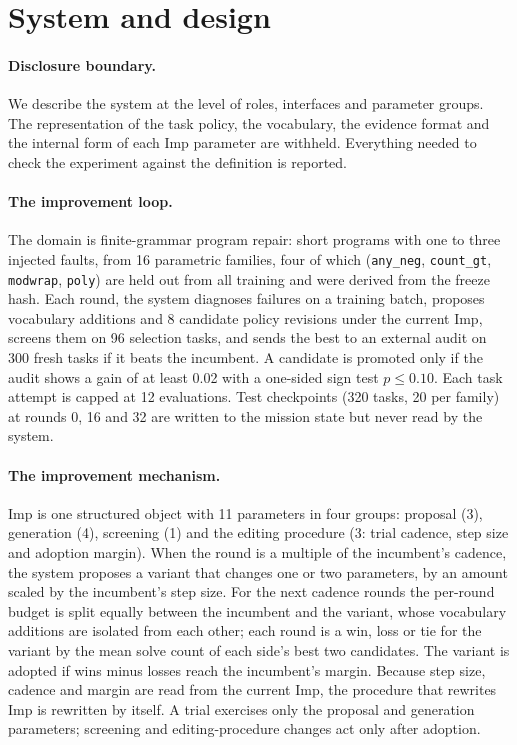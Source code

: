 \documentclass[11pt]{article}
\begin{document}
\section{System and design}\label{sec:design}

\paragraph{Disclosure boundary.} We describe the system at the level of roles, interfaces and parameter groups. The representation of the task policy, the vocabulary, the evidence format and the internal form of each Imp parameter are withheld. Everything needed to check the experiment against the definition is reported.

\paragraph{The improvement loop.} The domain is finite-grammar program repair: short programs with one to three injected faults, from 16 parametric families, four of which (\texttt{any\_neg}, \texttt{count\_gt}, \texttt{modwrap}, \texttt{poly}) are held out from all training and were derived from the freeze hash. Each round, the system diagnoses failures on a training batch, proposes vocabulary additions and 8 candidate policy revisions under the current Imp, screens them on 96 selection tasks, and sends the best to an external audit on 300 fresh tasks if it beats the incumbent. A candidate is promoted only if the audit shows a gain of at least 0.02 with a one-sided sign test $p \le 0.10$. Each task attempt is capped at 12 evaluations. Test checkpoints (320 tasks, 20 per family) at rounds 0, 16 and 32 are written to the mission state but never read by the system.

\paragraph{The improvement mechanism.} Imp is one structured object with 11 parameters in four groups: proposal (3), generation (4), screening (1) and the editing procedure (3: trial cadence, step size and adoption margin). When the round is a multiple of the incumbent's cadence, the system proposes a variant that changes one or two parameters, by an amount scaled by the incumbent's step size. For the next cadence rounds the per-round budget is split equally between the incumbent and the variant, whose vocabulary additions are isolated from each other; each round is a win, loss or tie for the variant by the mean solve count of each side's best two candidates. The variant is adopted if wins minus losses reach the incumbent's margin. Because step size, cadence and margin are read from the current Imp, the procedure that rewrites Imp is rewritten by itself. A trial exercises only the proposal and generation parameters; screening and editing-procedure changes act only after adoption.
\end{document}

